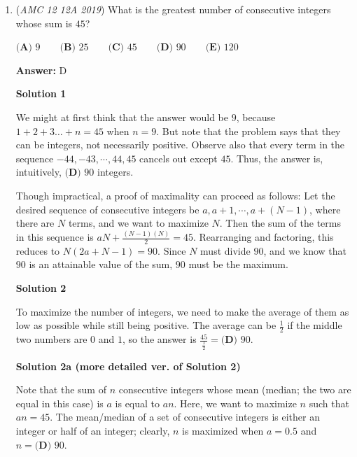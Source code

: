 \begin{enumerate}
 Education, The Study of Everything

 


	\item (\textit{AMC 12 12A 2019}) What is the greatest number of consecutive integers whose sum is $45$?


 $\textbf{(A) } 9 \qquad\textbf{(B) } 25 \qquad\textbf{(C) } 45 \qquad\textbf{(D) } 90 \qquad\textbf{(E) } 120$

 \textbf{Answer: }D



\textbf{Solution 1}

We might at first think that the answer would be $9$, because $1+2+3 \dots +n = 45$ when $n = 9$. But note that the problem says that they can be integers, not necessarily positive. Observe also that every term in the sequence $-44, -43, \cdots, 44, 45$ cancels out except $45$.  Thus, the answer is, intuitively, $\boxed{\textbf{(D) } 90 }$ integers.

 Though impractical, a proof of maximality can proceed as follows:  Let the desired sequence of consecutive integers be $a, a+1, \cdots, a+(N-1)$, where there are $N$ terms, and we want to maximize $N$.  Then the sum of the terms in this sequence is $aN + \frac{(N-1)(N)}{2}=45$.  Rearranging and factoring, this reduces to $N(2a+N-1) = 90$.  Since $N$ must divide $90$, and we know that $90$ is an attainable value of the sum, $90$ must be the maximum.

 



\textbf{Solution 2}

To maximize the number of integers, we need to make the average of them as low as possible while still being positive. The average can be $\frac12$ if the middle two numbers are $0$ and $1$, so the answer is $\frac{45}{\frac12}=\boxed{\textbf{(D) } 90 }$.

 



\textbf{Solution 2a (more detailed ver. of Solution 2)}

Note that the sum of $n$ consecutive integers whose mean (median; the two are equal in this case) is $a$ is equal to $an$. Here, we want to maximize $n$ such that $an=45$. The mean/median of a set of consecutive integers is either an integer or half of an integer; clearly, $n$ is maximized when $a=0.5$ and $n=\boxed{\textbf{(D) }90}$. 

 




\end{enumerate}
